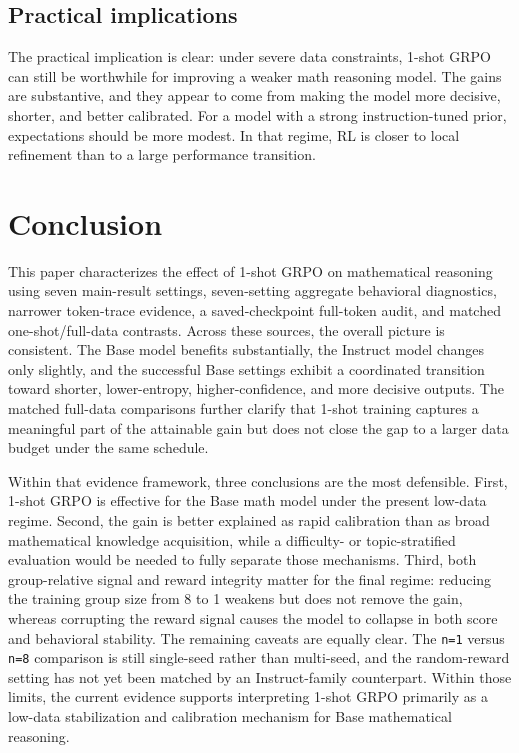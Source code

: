 \documentclass[12pt,a4paper]{ctexart}
\begin{document}
\subsection{Practical implications}

The practical implication is clear: under severe data constraints, 1-shot GRPO can still be worthwhile for improving a weaker math reasoning model. The gains are substantive, and they appear to come from making the model more decisive, shorter, and better calibrated. For a model with a strong instruction-tuned prior, expectations should be more modest. In that regime, RL is closer to local refinement than to a large performance transition.

\section{Conclusion}

This paper characterizes the effect of 1-shot GRPO on mathematical reasoning using seven main-result settings, seven-setting aggregate behavioral diagnostics, narrower token-trace evidence, a saved-checkpoint full-token audit, and matched one-shot/full-data contrasts. Across these sources, the overall picture is consistent. The Base model benefits substantially, the Instruct model changes only slightly, and the successful Base settings exhibit a coordinated transition toward shorter, lower-entropy, higher-confidence, and more decisive outputs. The matched full-data comparisons further clarify that 1-shot training captures a meaningful part of the attainable gain but does not close the gap to a larger data budget under the same schedule.

Within that evidence framework, three conclusions are the most defensible. First, 1-shot GRPO is effective for the Base math model under the present low-data regime. Second, the gain is better explained as rapid calibration than as broad mathematical knowledge acquisition, while a difficulty- or topic-stratified evaluation would be needed to fully separate those mechanisms. Third, both group-relative signal and reward integrity matter for the final regime: reducing the training group size from 8 to 1 weakens but does not remove the gain, whereas corrupting the reward signal causes the model to collapse in both score and behavioral stability. The remaining caveats are equally clear. The \texttt{n=1} versus \texttt{n=8} comparison is still single-seed rather than multi-seed, and the random-reward setting has not yet been matched by an Instruct-family counterpart. Within those limits, the current evidence supports interpreting 1-shot GRPO primarily as a low-data stabilization and calibration mechanism for Base mathematical reasoning.
\end{document}
